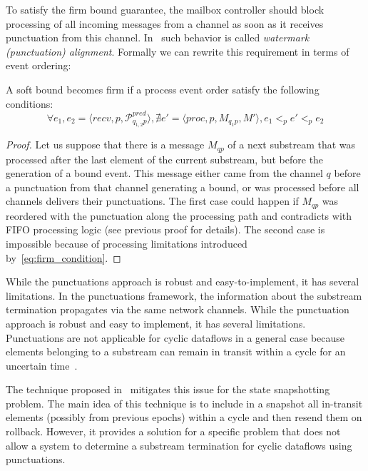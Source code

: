 To satisfy the firm bound guarantee, the mailbox controller should block processing of all incoming messages from a channel as soon as it receives punctuation from this channel. In~\cite{Carbone:2017:SMA:3137765.3137777} such behavior is called {\em watermark (punctuation) alignment}. Formally we can rewrite this requirement in terms of event ordering:

\begin{lemma}
A soft bound becomes firm if a process event order satisfy the following conditions:
\begin{equation}
  \forall e_1, e_2 = \langle recv, p, \mathcal{P}^{pred}_{q_{1,2}p} \rangle, \nexists e' = \langle proc, p, M_{q_1p}, M' \rangle, e_1 <_p e' <_p e_2
  \label{eq:firm_condition}
\end{equation}
\end{lemma}
\begin{proof}
Let us suppose that there is a message $M_{qp}$ of a next substream that was processed after the last element of the current substream, but before the generation of a bound event. This message either came from the channel $q$ before a punctuation from that channel generating a bound, or was processed before all channels delivers their punctuations. The first case could happen if $M_{qp}$ was reordered with the punctuation along the processing path and contradicts with FIFO processing logic (see previous proof for details). The second case is impossible because of processing limitations introduced by~\ref{eq:firm_condition}.
\end{proof}

While the punctuations approach is robust and easy-to-implement, it has several limitations. In the punctuations framework, the information about the substream termination propagates via the same network channels. While the punctuation approach is robust and easy to implement, it has several limitations. Punctuations are not applicable for cyclic dataflows in a general case because elements belonging to a substream can remain in transit within a cycle for an uncertain time~\cite{carbone2018scalable}. 

The technique proposed in~\cite{Carbone:2017:SMA:3137765.3137777} mitigates this issue for the state snapshotting problem. The main idea of this technique is to include in a snapshot all in-transit elements (possibly from previous epochs) within a cycle and then resend them on rollback. However, it provides a solution for a specific problem that does not allow a system to determine a substream termination for cyclic dataflows using punctuations.

